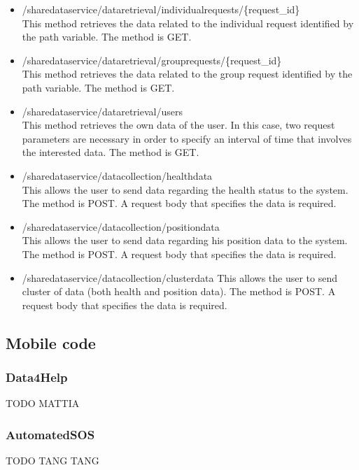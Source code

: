 \begin{itemize}
\item /sharedataservice/dataretrieval/individualrequests/\{request\_id\} \\
This method retrieves the data related to the individual request identified by the path variable. The method is GET.

\item /sharedataservice/dataretrieval/grouprequests/\{request\_id\} \\
This method retrieves the data related to the group request identified by the path variable. The method is GET.

\item /sharedataservice/dataretrieval/users \\
This method retrieves the own data of the user. In this case, two request parameters
are necessary in order to specify an interval of time that involves the interested data.
The method is GET.

\item /sharedataservice/datacollection/healthdata \\
This allows the user to send data regarding the health status to the system. The method is POST.
A request body that specifies the data is required.

\item /sharedataservice/datacollection/positiondata \\
This allows the user to send data regarding his position data to the system. The method is POST.
A request body that specifies the data is required.

\item /sharedataservice/datacollection/clusterdata
This allows the user to send cluster of data (both health and position data). The method is POST.
A request body that specifies the data is required.

\end{itemize}



\subsection{Mobile code}

\subsubsection{Data4Help}
TODO MATTIA

\subsubsection{AutomatedSOS}
TODO TANG TANG

